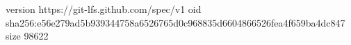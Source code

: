 version https://git-lfs.github.com/spec/v1
oid sha256:e56e279ad5b939344758a6526765d0c968835d6604866526fea4f659ba4dc847
size 98622
